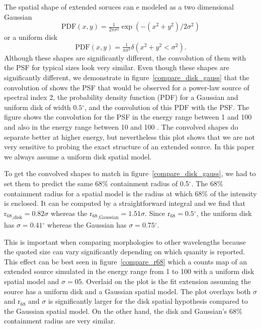 \documentclass[12pt,preprint]{aastex}
\newcommand{\gev}{\text{GeV}\xspace}
\newcommand{\rsixeight}{{\ensuremath{\text{r}_{68}}}\xspace}
\renewcommand{\deg}{\ensuremath{^\circ}\xspace}
\begin{document}
The spatial shape of extended soruces can e modeled
as a two dimensional Gaussian
\begin{equation}
  \text{PDF}(x,y)=\tfrac{1}{2\pi\sigma^2}\exp\left(-(x^2+y^2)/2\sigma^2\right)
\end{equation}
or a uniform disk
\begin{equation}
  \text{PDF}(x,y)=\tfrac{1}{\pi\sigma^2}\delta\left(x^2+y^2<\sigma^2\right).
\end{equation}
Although these shapes are significantly different, the convolution
of them with the PSF for typical sizes look very similar.  Even
though these shapes are significantly different, we demonstrate in
figure~\ref{compare_disk_gauss} that the convolution of shows the
PSF that would be observed for a power-law source of spectral index
2, the probability density function (PDF) for a Gaussian and uniform
disk of width $0.5\deg$, and the convolution of this PDF with the PSF.
The figure shows the convolution for the PSF in the energy range between
1 \gev and 100 \gev and also in the energy range between 10 \gev and
100 \gev.  The convolved shapes do separate better at higher energy, but
nevertheless this plot shows that we are not very sensitive to probing
the exact structure of an extended source.  In this paper we always
assume a uniform disk spatial model.

To get the convolved shapes to match in figure~\ref{compare_disk_gauss},
we had to set them to predict the same 68\% containment radius of 0.5\deg.  The
68\% containment radius for a spatial model is the radius at which 68\%
of the intensity is enclosed.  It can be computed by a straightforward
integral and we find that $\rsixeight_\text{,disk}=0.82\sigma$ whereas the
$\rsixeight_\text{,Gaussian}=1.51\sigma$.  Since $\rsixeight=0.5\deg$,
the uniform disk has $\sigma=0.41\deg$ whereas the Gaussian has
$\sigma=0.75\deg$.

This is important when comparing morphologies to other wavelengths
because the quoted size can vary significantly depending on which quanity
is reported.  This effect can be best seen in figure~\ref{compare_r68}
which a counts map of an extended source simulated in the energy
range from 1 \gev to 100 \gev with a uniform disk spatial model and
$\sigma=05$. Overlaid on the plot is the fit extension assuming the
source has a uniform disk and a Gaussian spatial model. The plot overlays
both $\sigma$ and $\rsixeight$ and $\sigma$ is significantly larger for
the disk spatial hypothesis compared to the Gaussian spatial model. On
the other hand, the disk and Gaussian's 68\% containment radius are
very similar.
\end{document}
